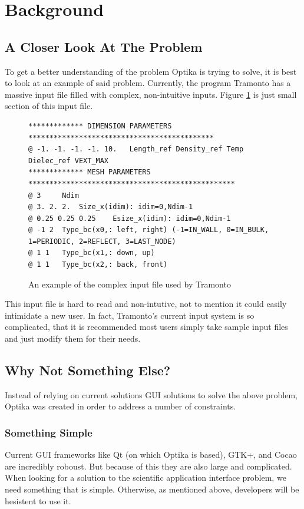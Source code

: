 \section{Background}
\subsection{A Closer Look At The Problem}
To get a better understanding of the problem Optika is trying to solve, it is
best to look at an example of said problem. Currently, the program Tramonto has
a massive input file filled with complex, non-intuitive inputs. Figure
\ref{tramontoInputFigure} is just small section of this input file.
\begin{figure}
  \centering
  {\footnotesize
  \begin{verbatim}
************* DIMENSION PARAMETERS ********************************************
@ -1. -1. -1. -1. 10. 	Length_ref Density_ref Temp Dielec_ref VEXT_MAX 
************* MESH PARAMETERS *************************************************
@ 3 	Ndim 
@ 3. 2. 2. 	Size_x(idim): idim=0,Ndim-1 
@ 0.25 0.25 0.25 	Esize_x(idim): idim=0,Ndim-1 
@ -1 2 	Type_bc(x0,: left, right) (-1=IN_WALL, 0=IN_BULK, 1=PERIODIC, 2=REFLECT, 3=LAST_NODE) 
@ 1 1 	Type_bc(x1,: down, up) 
@ 1 1 	Type_bc(x2,: back, front) 
  \end{verbatim}
  }
  \caption[Tramonto Input]{An example of the complex input file used by Tramonto}
  \label{tramontoInputFigure}
\end{figure}
This input file is hard to read and non-intutive, not to mention it could 
easily intimidate
a new user. In fact, Tramonto's current input system is so complicated, 
that it is recommended most users simply take sample input files and just 
modify them for their needs.

\subsection{Why Not Something Else?}
Instead of relying on current solutions GUI solutions to solve the above problem, Optika was created in order to address
a number of constraints.
\subsubsection{Something Simple}
Current GUI frameworks like Qt (on which Optika is based), GTK+, and Cocao are incredibly roboust. But
because of this they are also large and complicated. When looking for a solution to the 
scientific application interface problem, we need something that is simple. Otherwise, as mentioned
above, developers will be hesistent to use it.

